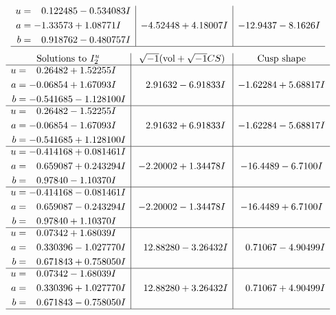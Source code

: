 \documentclass[1p]{elsarticle_modified}
\theoremstyle{definition}
\newcommand{\I}{\sqrt{-1}}
\begin{document}
$$\begin{array}{c|c|c}
\begin{aligned}
u &= \phantom{-}0.122485 - 0.534083 I \\
a &= -1.33573 + 1.08771 I \\
b &= \phantom{-}0.918762 - 0.480757 I\end{aligned}
 & -4.52448 + 4.18007 I & -12.9437 - 8.1626 I\\
 \hline 
 \end{array}$$\newpage$$\begin{array}{c|c|c}  
\text{Solutions to }I^u_{2}& \I (\text{vol} + \sqrt{-1}CS) & \text{Cusp shape}\\
 \hline 
\begin{aligned}
u &= \phantom{-}0.26482 + 1.52255 I \\
a &= -0.06854 + 1.67093 I \\
b &= -0.541685 - 1.128100 I\end{aligned}
 & \phantom{-}2.91632 - 6.91833 I & -1.62284 + 5.68817 I \\ \hline\begin{aligned}
u &= \phantom{-}0.26482 - 1.52255 I \\
a &= -0.06854 - 1.67093 I \\
b &= -0.541685 + 1.128100 I\end{aligned}
 & \phantom{-}2.91632 + 6.91833 I & -1.62284 - 5.68817 I \\ \hline\begin{aligned}
u &= -0.414168 + 0.081461 I \\
a &= \phantom{-}0.659087 + 0.243294 I \\
b &= \phantom{-}0.97840 - 1.10370 I\end{aligned}
 & -2.20002 + 1.34478 I & -16.4489 - 6.7100 I \\ \hline\begin{aligned}
u &= -0.414168 - 0.081461 I \\
a &= \phantom{-}0.659087 - 0.243294 I \\
b &= \phantom{-}0.97840 + 1.10370 I\end{aligned}
 & -2.20002 - 1.34478 I & -16.4489 + 6.7100 I \\ \hline\begin{aligned}
u &= \phantom{-}0.07342 + 1.68039 I \\
a &= \phantom{-}0.330396 - 1.027770 I \\
b &= \phantom{-}0.671843 + 0.758050 I\end{aligned}
 & \phantom{-}12.88280 - 3.26432 I & \phantom{-}0.71067 - 4.90499 I \\ \hline\begin{aligned}
u &= \phantom{-}0.07342 - 1.68039 I \\
a &= \phantom{-}0.330396 + 1.027770 I \\
b &= \phantom{-}0.671843 - 0.758050 I\end{aligned}
 & \phantom{-}12.88280 + 3.26432 I & \phantom{-}0.71067 + 4.90499 I\\
 \hline 
 \end{array}$$\newpage
\end{document}

